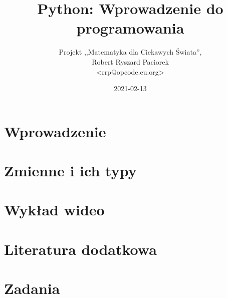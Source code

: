 \documentclass{pdfBooklets}
\title{Python: Wprowadzenie do programowania}
\author{%
	Projekt ,,Matematyka dla Ciekawych Świata'',\\
	Robert Ryszard Paciorek\\\normalsize\ttfamily <rrp@opcode.eu.org>
}
\date  {2021-02-13}
\begin{document}
\maketitle

\section{Wprowadzenie}


\student{\clearpage}

\student{\clearpage}


\student{\clearpage}
\section{Zmienne i ich typy}















\section{Wykład wideo}



\section{Literatura dodatkowa }


\student{\clearpage}
\section{Zadania}




\end{document}
